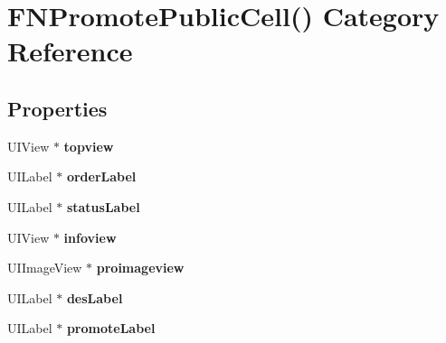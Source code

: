 \hypertarget{category_f_n_promote_public_cell_07_08}{}\section{F\+N\+Promote\+Public\+Cell() Category Reference}
\label{category_f_n_promote_public_cell_07_08}
\subsection*{Properties}
\begin{DoxyCompactItemize}
\item 
\mbox{\label{category_f_n_promote_public_cell_07_08_aefc6a0414f1f2900b7f3e3400961579a}} 
U\+I\+View $\ast$ {\bfseries topview}
\item 
\mbox{\label{category_f_n_promote_public_cell_07_08_a5e76107417b76be29ce235774bb22a84}} 
U\+I\+Label $\ast$ {\bfseries order\+Label}
\item 
\mbox{\label{category_f_n_promote_public_cell_07_08_ad3f62a62812e4c3fb6945cedfa62e57e}} 
U\+I\+Label $\ast$ {\bfseries status\+Label}
\item 
\mbox{\label{category_f_n_promote_public_cell_07_08_a1c703f2a72afe21ec15d66f26739df2a}} 
U\+I\+View $\ast$ {\bfseries infoview}
\item 
\mbox{\label{category_f_n_promote_public_cell_07_08_a1cd857239fc334dd1b66b6d7058e66d9}} 
U\+I\+Image\+View $\ast$ {\bfseries proimageview}
\item 
\mbox{\label{category_f_n_promote_public_cell_07_08_a6b2b3e3459d4a9cac4a728120fd9f1c3}} 
U\+I\+Label $\ast$ {\bfseries des\+Label}
\item 
\mbox{\label{category_f_n_promote_public_cell_07_08_af5e66e078960c367f9da97635a4e663b}} 
U\+I\+Label $\ast$ {\bfseries promote\+Label}
\item 
\mbox{\label{category_f_n_promote_public_cell_07_08_ac7815ecfb2d9105ece5b96d749bedce7}} 

\end{DoxyCompactItemize}
